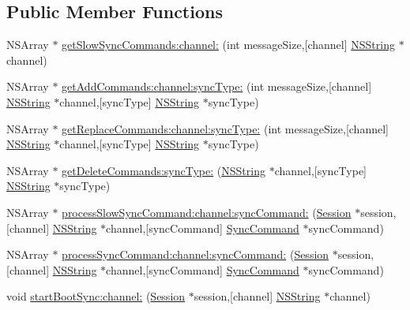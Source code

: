 \subsection*{\-Public \-Member \-Functions}
\begin{DoxyCompactItemize}
\item 
\-N\-S\-Array $\ast$ \hyperlink{interface_sync_engine_a6e7142c02c950dab0f20aa3df95ee8b3}{get\-Slow\-Sync\-Commands\-:channel\-:} (int message\-Size,\mbox{[}channel\mbox{]} \hyperlink{class_n_s_string}{\-N\-S\-String} $\ast$channel)
\item 
\-N\-S\-Array $\ast$ \hyperlink{interface_sync_engine_ac60bcac2fe8723bfb8dfa764e4fbccd1}{get\-Add\-Commands\-:channel\-:sync\-Type\-:} (int message\-Size,\mbox{[}channel\mbox{]} \hyperlink{class_n_s_string}{\-N\-S\-String} $\ast$channel,\mbox{[}sync\-Type\mbox{]} \hyperlink{class_n_s_string}{\-N\-S\-String} $\ast$sync\-Type)
\item 
\-N\-S\-Array $\ast$ \hyperlink{interface_sync_engine_a4af882328e810b64b5cd65e2619b57f1}{get\-Replace\-Commands\-:channel\-:sync\-Type\-:} (int message\-Size,\mbox{[}channel\mbox{]} \hyperlink{class_n_s_string}{\-N\-S\-String} $\ast$channel,\mbox{[}sync\-Type\mbox{]} \hyperlink{class_n_s_string}{\-N\-S\-String} $\ast$sync\-Type)
\item 
\-N\-S\-Array $\ast$ \hyperlink{interface_sync_engine_af39da5ab76c8f3c55c61b36a66f639f2}{get\-Delete\-Commands\-:sync\-Type\-:} (\hyperlink{class_n_s_string}{\-N\-S\-String} $\ast$channel,\mbox{[}sync\-Type\mbox{]} \hyperlink{class_n_s_string}{\-N\-S\-String} $\ast$sync\-Type)
\item 
\-N\-S\-Array $\ast$ \hyperlink{interface_sync_engine_a474e4b85f25287c96e3ae0538824f8e1}{process\-Slow\-Sync\-Command\-:channel\-:sync\-Command\-:} (\hyperlink{interface_session}{\-Session} $\ast$session,\mbox{[}channel\mbox{]} \hyperlink{class_n_s_string}{\-N\-S\-String} $\ast$channel,\mbox{[}sync\-Command\mbox{]} \hyperlink{interface_sync_command}{\-Sync\-Command} $\ast$sync\-Command)
\item 
\-N\-S\-Array $\ast$ \hyperlink{interface_sync_engine_ad8be9dec33fb1b34dcbff07a2ae897ff}{process\-Sync\-Command\-:channel\-:sync\-Command\-:} (\hyperlink{interface_session}{\-Session} $\ast$session,\mbox{[}channel\mbox{]} \hyperlink{class_n_s_string}{\-N\-S\-String} $\ast$channel,\mbox{[}sync\-Command\mbox{]} \hyperlink{interface_sync_command}{\-Sync\-Command} $\ast$sync\-Command)
\item 
void \hyperlink{interface_sync_engine_a4ebd9b360794be097da8495f07f60fab}{start\-Boot\-Sync\-:channel\-:} (\hyperlink{interface_session}{\-Session} $\ast$session,\mbox{[}channel\mbox{]} \hyperlink{class_n_s_string}{\-N\-S\-String} $\ast$channel)

\end{DoxyCompactItemize}
